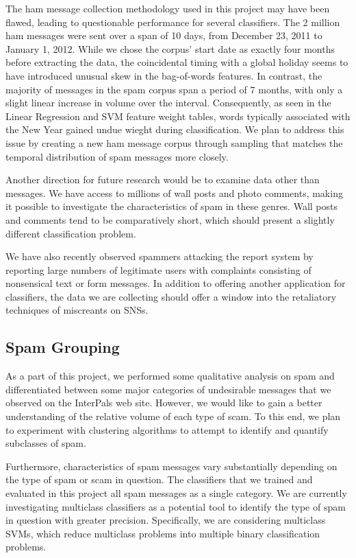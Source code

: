 \documentclass[preprint]{acm_proc_article-sp}
\begin{document}
The ham message collection methodology used in this project may have been flawed, leading to questionable 
performance for several classifiers. The 2 million ham messages were sent over a span of 10 days, from 
December 23, 2011 to January 1, 2012. While we chose the corpus' start date as exactly four months before 
extracting the data, the coincidental timing with a global holiday seems to have introduced unusual 
skew in the bag-of-words features. In contrast, the majority of messages in the spam corpus span a period of 
7 months, with only a slight linear increase in volume over the interval.  Consequently, as seen in 
the Linear Regression and SVM feature weight tables, words typically associated with the New Year gained 
undue wieght during classification.  We plan to address this issue by creating a new ham message corpus 
through sampling that matches the temporal distribution of spam messages more closely.

Another direction for future research would be to examine data other than messages. We have access to millions 
of wall posts and photo comments, making it possible to investigate the characteristics of spam in these genres. 
Wall posts and comments tend to be comparatively short, which should present a slightly different classification 
problem.

We have also recently observed spammers attacking the report system by reporting large numbers of legitimate users 
with complaints consisting of nonsensical text or form messages. In addition to offering another application for 
classifiers, the data we are collecting should offer a window into the retaliatory techniques of miscreants on 
SNSs.

\subsection{Spam Grouping}

As a part of this project, we performed some qualitative analysis on spam and differentiated between 
some major categories of undesirable messages that we observed on the InterPals web site. However, we would 
like to gain a better understanding of the relative volume of each type of scam. To this end, we plan to 
experiment with clustering algorithms to attempt to identify and quantify subclasses of spam. 

Furthermore, characteristics of spam messages vary substantially depending on the type of spam or scam in question. 
The classifiers that we trained and evaluated in this project all spam messages as a single category. We are currently 
investigating multiclass classifiers as a potential tool to identify the type of 
spam in question with greater precision. Specifically, we are considering multiclass SVMs, which reduce 
multiclass problems into multiple binary classification problems.\cite{duan} 
\end{document}
